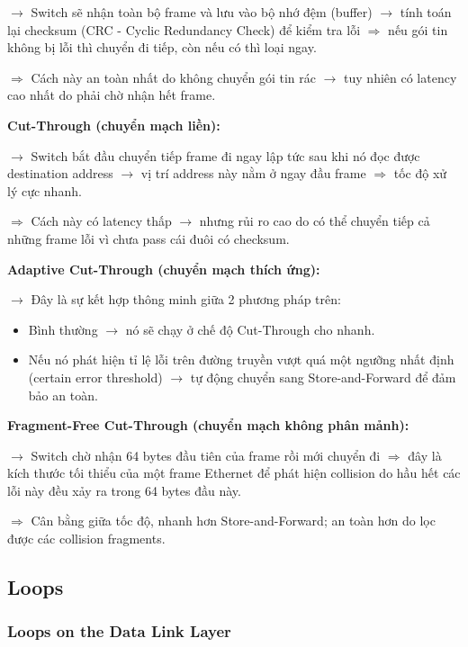 \noindent
$\rightarrow$ Switch sẽ nhận toàn bộ frame và lưu vào bộ nhớ đệm (buffer) $\rightarrow$ tính toán lại checksum (CRC - Cyclic Redundancy Check) để kiểm tra lỗi $\Rightarrow$ nếu gói tin không bị lỗi thì chuyển đi tiếp, còn nếu có thì loại ngay.

$\Rightarrow$ Cách này an toàn nhất do không chuyển gói tin rác $\rightarrow$ tuy nhiên có latency cao nhất do phải chờ nhận hết frame.
\medskip

\noindent
\textbf{Cut-Through (chuyển mạch liền):}
\medskip

\noindent
$\rightarrow$ Switch bắt đầu chuyển tiếp frame đi ngay lập tức sau khi nó đọc được destination address $\rightarrow$ vị trí address này nằm ở ngay đầu frame $\Rightarrow$ tốc độ xử lý cực nhanh.

$\Rightarrow$ Cách này có latency thấp $\rightarrow$ nhưng rủi ro cao do có thể chuyển tiếp cả những frame lỗi vì chưa pass cái đuôi có checksum.
\medskip

\noindent
\textbf{Adaptive Cut-Through (chuyển mạch thích ứng):}
\medskip

\noindent
$\rightarrow$ Đây là sự kết hợp thông minh giữa 2 phương pháp trên:

\begin{itemize}
    \item Bình thường $\rightarrow$ nó sẽ chạy ở chế độ Cut-Through cho nhanh.
    \item[$\Rightarrow$] Nếu nó phát hiện tỉ lệ lỗi trên đường truyền vượt quá một ngưỡng nhất định (certain error threshold) $\rightarrow$ tự động chuyển sang Store-and-Forward để đảm bảo an toàn.
\end{itemize}
\medskip

\noindent
\textbf{Fragment-Free Cut-Through (chuyển mạch không phân mảnh):}
\medskip

\noindent
$\rightarrow$ Switch chờ nhận 64 bytes đầu tiên của frame rồi mới chuyển đi $\Rightarrow$ đây là kích thước tối thiểu của một frame Ethernet để phát hiện collision do hầu hết các lỗi này đều xảy ra trong 64 bytes đầu này.

$\Rightarrow$ Cân bằng giữa tốc độ, nhanh hơn Store-and-Forward; an toàn hơn do lọc được các collision fragments.
\medskip

\subsection{Loops}

\subsubsection{Loops on the Data Link Layer}

